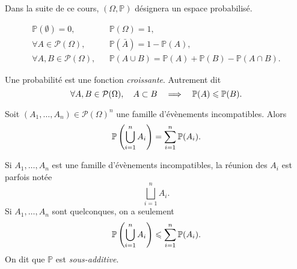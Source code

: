 \documentclass{magnolia}
\begin{document}
Dans la suite de ce cours, $(\Omega,\mathbb{P})$ désignera un espace probabilisé.

\begin{proposition}
\begin{eqnarray*}
\mathbb{P}(\emptyset)=0,& &\mathbb{P}(\Omega)=1,\\
\forall A\in\mathcal{P}(\Omega),& &\mathbb{P}(\bar{A})=1-\mathbb{P}(A),\\
\forall A,B\in\mathcal{P}(\Omega),& &\mathbb{P}(A\cup B)=\mathbb{P}(A)+\mathbb{P}(B)-\mathbb{P}(A\cap B).
\end{eqnarray*}
\end{proposition}

\begin{proposition}
Une probabilité est une fonction \emph{croissante}. Autrement dit
\[\forall A,B\in\mathcal{P}(\Omega),\quad A\subset B \quad\Longrightarrow\quad \mathbb{P}(A)\leqslant\mathbb{P}(B).\]
\end{proposition}

\begin{proposition}
Soit $(A_1,\ldots,A_n)\in\mathcal{P}(\Omega)^n$ une famille d'évènements incompatibles.
Alors
\[\mathbb{P}\left(\bigcup_{i=1}^n A_i\right)=\sum_{i=1}^n \mathbb{P}(A_i).\]
\end{proposition}

\begin{remarques}
\remarque Si $A_1,\ldots,A_n$ est une famille d'évènements incompatibles, la réunion des $A_i$ est parfois
  notée
  \[\bigsqcup_{i=1}^n A_i.\]
\remarque Si $A_1,\ldots,A_n$ sont quelconques, on a seulement
  \[\mathbb{P}\left(\bigcup_{i=1}^n A_i\right)\leqslant\sum_{i=1}^n \mathbb{P}(A_i).\]
  On dit que $\mathbb{P}$ est \emph{sous-additive}. 
\end{remarques}
\end{document}
